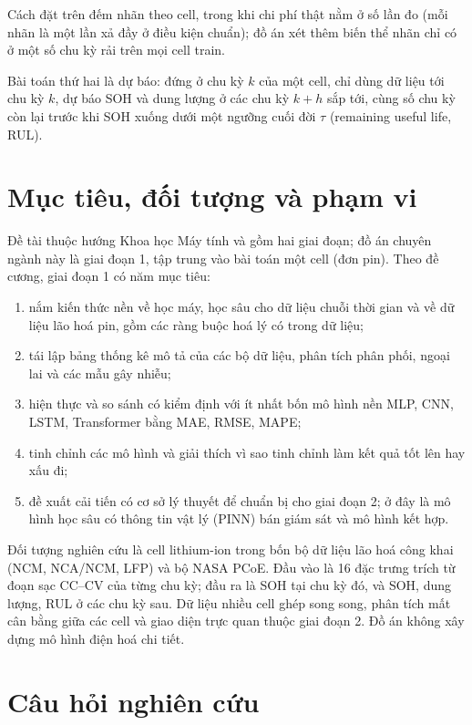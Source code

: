 \documentclass[12pt,a4paper,oneside]{report}
\theoremstyle{plain}
\theoremstyle{definition}
\begin{document}
Cách đặt trên đếm nhãn theo cell, trong khi chi phí thật nằm ở số lần đo (mỗi nhãn là một lần xả đầy ở điều kiện
chuẩn); đồ án xét thêm biến thể nhãn chỉ có ở một số chu kỳ rải trên mọi cell train.

Bài toán thứ hai là dự báo: đứng ở chu kỳ $k$ của một cell, chỉ dùng dữ liệu tới chu kỳ $k$, dự báo SOH và dung
lượng ở các chu kỳ $k + h$ sắp tới, cùng số chu kỳ còn lại trước khi SOH xuống dưới một ngưỡng cuối đời $\tau$
(remaining useful life, RUL).

\section{Mục tiêu, đối tượng và phạm vi}

Đề tài thuộc hướng Khoa học Máy tính và gồm hai giai đoạn; đồ án chuyên ngành này là giai đoạn 1, tập trung vào bài
toán một cell (đơn pin). Theo đề cương, giai đoạn 1 có năm mục tiêu:
\begin{enumerate}[label=(\roman*)]
\item nắm kiến thức nền về học máy, học sâu cho dữ liệu chuỗi thời gian và về dữ liệu lão hoá pin, gồm các ràng buộc
      hoá lý có trong dữ liệu;
\item tái lập bảng thống kê mô tả của các bộ dữ liệu, phân tích phân phối, ngoại lai và các mẫu gây nhiễu;
\item hiện thực và so sánh có kiểm định với ít nhất bốn mô hình nền MLP, CNN, LSTM, Transformer bằng MAE, RMSE, MAPE;
\item tinh chỉnh các mô hình và giải thích vì sao tinh chỉnh làm kết quả tốt lên hay xấu đi;
\item đề xuất cải tiến có cơ sở lý thuyết để chuẩn bị cho giai đoạn 2; ở đây là mô hình học sâu có thông tin vật lý
      (PINN) bán giám sát và mô hình kết hợp.
\end{enumerate}

Đối tượng nghiên cứu là cell lithium-ion trong bốn bộ dữ liệu lão hoá công khai (NCM, NCA/NCM, LFP) và bộ NASA PCoE.
Đầu vào là 16 đặc trưng trích từ đoạn sạc CC--CV của từng chu kỳ; đầu ra là SOH tại chu kỳ đó, và SOH, dung lượng,
RUL ở các chu kỳ sau. Dữ liệu nhiều cell ghép song song, phân tích mất cân bằng giữa các cell và giao diện trực quan
thuộc giai đoạn 2. Đồ án không xây dựng mô hình điện hoá chi tiết.
\section{Câu hỏi nghiên cứu}
\end{document}
